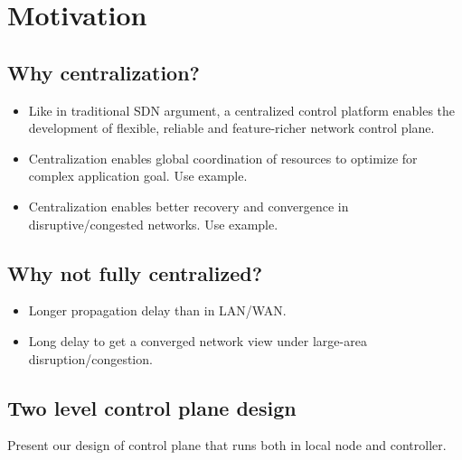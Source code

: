 \section{Motivation}
\subsection{Why centralization?}
\begin{itemize}
	\item Like in traditional SDN argument, a centralized control platform enables the development of flexible, reliable and feature-richer network control plane.
	\item Centralization enables global coordination of resources to optimize for complex application goal. Use example.
	\item Centralization enables better recovery and convergence in disruptive/congested networks. Use example.
\end{itemize}

\subsection{Why not fully centralized?}
\begin{itemize}
	\item Longer propagation delay than in LAN/WAN. 
	\item Long delay to get a converged network view under large-area disruption/congestion. 
\end{itemize}

\subsection{Two level control plane design}
Present our design of control plane that runs both in local node and controller.

